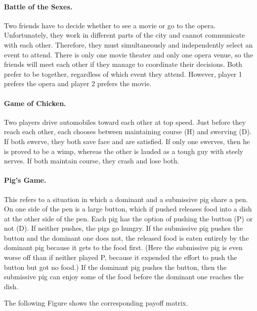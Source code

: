\paragraph{Battle of the Sexes.} Two friends have to decide whether to see a movie or go to the opera. Unfortunately, they work in different parts of the city and cannot communicate with each other. Therefore, they must simultaneously and independently select an event to attend. There is only one movie theater and only one opera venue, so the friends will meet each other if they manage to coordinate their decisions. Both prefer to be together, regardless of which event they attend. However, player 1 prefers the opera and player 2 prefers the movie.

\paragraph{Game of Chicken.} Two players drive automobiles toward each other at top speed. Just before they reach each other, each chooses between maintaining course (H) and swerving (D). If both swerve, they both save face and are satisfied. If only one swerves, then he is proved to be a wimp, whereas the other is lauded as a tough guy with steely nerves. If both maintain course, they crash and lose both.

\paragraph{Pig's Game.} This refers to a situation in which a dominant and a submissive pig share a pen. On one side of the pen is a large button, which if pushed releases food into a dish at the other side of the pen. Each pig has the option of pushing the button (P) or not (D). If neither pushes, the pigs go hungry. If the submissive pig pushes the button and the dominant one does not, the released food is eaten entirely by the dominant pig because it gets to the food first. (Here the submissive pig is even worse off than if neither played P, because it expended the effort to push the button but got no food.) If the dominant pig pushes the button, then the submissive pig can enjoy some of the food before the dominant one reaches the dish.

The following Figure shows the corresponding payoff matrix.


